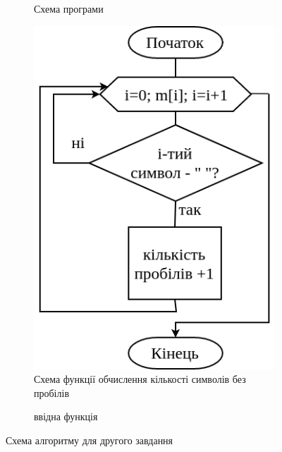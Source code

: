 \documentclass[12pt]{extreport}
\begin{document}
\begin{figure}[h]
	\begin{subfigure}[b]{.3\textwidth}
	\centering
	
		\caption{Схема програми}
	\end{subfigure}
	\hfill
	\begin{subfigure}[b]{.3\textwidth}
	\centering
		\includegraphics[width=.9\textwidth]{fch/fchc.png}
		\caption{Схема функції обчислення кількості символів без пробілів}
	\end{subfigure}
	\hfill
	\begin{subfigure}[b]{.3\textwidth}
	\centering
	
		\caption{ввідна функція}
	\end{subfigure}
	\caption{Схема алгоритму для другого завдання}
	\label{task2}
\end{figure}

\newpage
\end{document}

